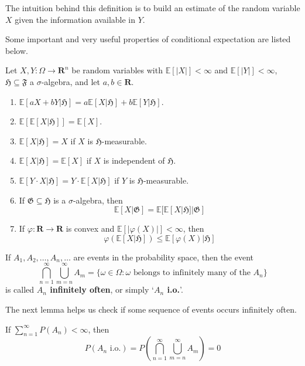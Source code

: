 The intuition behind this definition is to build an estimate of the random variable $X$ given the information available in $Y$.

Some important and very useful properties of conditional expectation are listed below.

\begin{theorem}
	Let $X, Y : \Omega \longrightarrow \textbf{R}^n$ be random variables with $\mathbb{E}[|X|] < \infty$ and $\mathbb{E}[|Y|] < \infty$, $\mathfrak{H} \subseteq \mathfrak{F}$ a $\sigma$-algebra, and let $a, b \in \textbf{R}$.
	\begin{enumerate}
		\item $\mathbb{E} [ a X + b Y | \mathfrak{H}] = a \mathbb{E} [X | \mathfrak{H}] + b \mathbb{E} [Y | \mathfrak{H}]$.
		\item $\mathbb{E} [ \mathbb{E} [X | \mathfrak{H}] ] = \mathbb{E} [X]$.
		\item $\mathbb{E} [X | \mathfrak{H}] = X$ if $X$ is $\mathfrak{H}$-measurable.
		\item $\mathbb{E} [X | \mathfrak{H}] = \mathbb{E} [X]$ if $X$ is independent of $\mathfrak{H}$.
		\item $\mathbb{E} [Y \cdot X | \mathfrak{H}] = Y \cdot \mathbb{E} [X | \mathfrak{H}]$ if $Y$ is $\mathfrak{H}$-measurable.
		\item If $\mathfrak{G} \subseteq \mathfrak{H}$ is a $\sigma$-algebra, then \[ \mathbb{E} [X | \mathfrak{G}] = \mathbb{E} [ \mathbb{E} [X | \mathfrak{H}] | \mathfrak{G}] \]
		\item If $\varphi : \textbf{R} \longrightarrow \textbf{R}$ is convex and $\mathbb{E} [ | \varphi (X) | ] < \infty$, then \[ \varphi (\mathbb{E} [X | \mathfrak{H}]) \leq \mathbb{E} [\varphi(X) | \mathfrak{H}] \]
	\end{enumerate}
\end{theorem}

\begin{definition}
If $A_1, A_2, \ldots, A_n, \ldots$ are events in the probability space, then the event
\[
	\bigcap_{n=1}^\infty \bigcup_{m=n}^\infty A_m = \{ \omega \in \Omega : \omega \text{ belongs to infinitely many of the } A_n \}
\]
is called \textbf{$A_n$ infinitely often}, or simply `\textbf{$A_n$ i.o.}'.
\end{definition}

The next lemma helps us check if some sequence of events occurs infinitely often.

\begin{lemma}
	If $\sum_{n=1}^\infty P(A_n) < \infty$, then
	\[
		P(A_n \text{ i.o.}) = P \left( \bigcap_{n=1}^\infty \bigcup_{m=n}^\infty A_m \right) = 0
	\]
\end{lemma}

